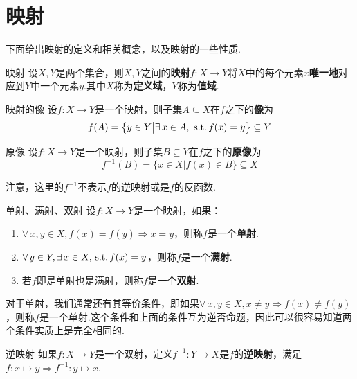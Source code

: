 \section{映射}
下面给出映射的定义和相关概念，以及映射的一些性质.


\begin{definition}{映射}
    设$X,Y$是两个集合，则$X,Y$之间的\textbf{映射}$f:X\to Y$将$X$中的每个元素$x$\textbf{唯一地}对应到$Y$中一个元素$y$.其中$X$称为\textbf{定义域}，$Y$称为\textbf{值域}.
\end{definition}

\begin{definition}{映射的像}
    设$f:X\to Y$是一个映射，则子集$A\subseteq X$在$f$之下的\textbf{像}为
    \[f(A)=\big\{y\in Y\big|\exists\, x\in A,\,\operatorname{\,\text{s.t.}} f(x)=y \big\}\subseteq Y\]
\end{definition}

\begin{definition}{原像}
    设$f:X\to Y$是一个映射，则子集$B\subseteq Y$在$f$之下的\textbf{原像}为
    \[f^{-1}(B)=\big\{x\in X\big|f(x)\in B \big\}\subseteq X\]
\end{definition}

\begin{notice}
    注意，这里的$f^{-1}$不表示$f$的逆映射或是$f$的反函数.
\end{notice}

\begin{definition}{单射、满射、双射}
    设$f:X\to Y$是一个映射，如果：
    \begin{enumerate}
        \item $\forall\, x,y\in X,f(x)=f(y)\Rightarrow x=y$，则称$f$是一个\textbf{单射}.
        \item $\forall\,y\in Y,\exists\, x\in X,\operatorname{\,\text{s.t.}} f(x)=y$，则称$f$是一个\textbf{满射}.
        \item 若$f$即是单射也是满射，则称$f$是一个\textbf{双射}.
    \end{enumerate}
\end{definition}
对于单射，我们通常还有其等价条件，即如果$\forall\, x,y\in X,x\neq y\Rightarrow f(x)\neq f(y)$，则称$f$是一个单射.这个条件和上面的条件互为逆否命题，因此可以很容易知道两个条件实质上是完全相同的.





\begin{definition}{逆映射}
    如果$f:X\to Y$是一个双射，定义$f^{-1}:Y\to X$是$f$的\textbf{逆映射}，满足$f:x\mapsto y \Rightarrow f^{-1}:y\mapsto x$.
\end{definition}

